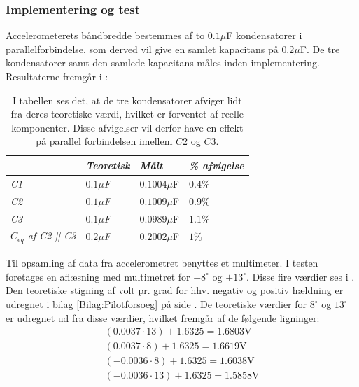 \subsubsection{Implementering og test}
Accelerometerets båndbredde bestemmes af to $0.1\mu$F kondensatorer i parallelforbindelse, som derved vil give en samlet kapacitans på  $0.2\mu$F. De tre kondensatorer samt den samlede kapacitans måles inden implementering. Resultaterne fremgår i  :
\begin{table}[H]
	\centering
	\begin{tabular}{|l|l|l|l|}\hline
		& \textit{Teoretisk} & \textit{Målt} & \textit{\% afvigelse} \\ \hline
		\textit{C1}       & \textit{$0.1\mu$F} & $0.1004\mu$F  & $0.4\%$               \\ \hline		
		\textit{C2}       & \textit{$0.1\mu$F} & $0.1009\mu$F  & $0.9\%$               \\ \hline
		\textit{C3}       & \textit{$0.1\mu$F} & $0.0989\mu$F  & $1.1\%$               \\ \hline
		\textit{$C_{eq}$ af C2 || C3} & \textit{$0.2\mu$F} & $0.2002\mu$F  & $1\%$                \\ \hline
	\end{tabular}
	\caption{I tabellen ses det, at de tre kondensatorer afviger lidt fra deres teoretiske værdi, hvilket er forventet af reelle komponenter. Disse afvigelser vil derfor have en effekt på parallel forbindelsen imellem $C2$ og $C3$.}
	\label{Tab:Acc_kondensator}
\end{table}
\noindent Til opsamling af data fra accelerometret benyttes et multimeter. I testen foretages en aflæsning med multimetret for $\pm8^\circ$ og $\pm13^\circ$. Disse fire værdier ses i . Den teoretiske stigning af volt pr. grad for hhv. negativ og positiv hældning er udregnet i bilag \ref{Bilag:Pilotforsoeg} på side \pageref{Bilag:Pilotforsoeg}. De teoretiske værdier for $8^\circ$ og $13^\circ$ er udregnet ud fra disse værdier, hvilket fremgår af de følgende ligninger:
\begin{align}
(0.0037 \cdot 13) + 1.6325 = 1.6803\text{V} \\
(0.0037 \cdot 8) + 1.6325 = 1.6619\text{V}  \\
(-0.0036 \cdot 8) + 1.6325 = 1.6038\text{V}  \\
(-0.0036 \cdot 13) + 1.6325 = 1.5858\text{V}
\end{align}
